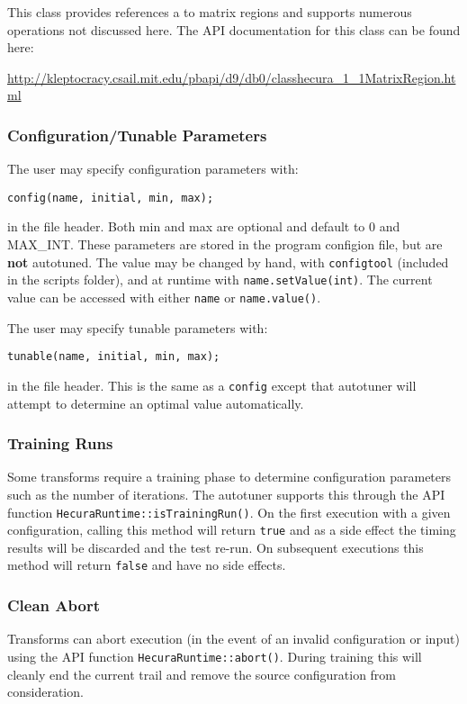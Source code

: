 \documentclass[11pt]{article}
\begin{document}
This class provides references a to matrix regions and supports numerous operations
not discussed here.  The API documentation for this class can be found here:

\noindent
\url{http://kleptocracy.csail.mit.edu/pbapi/d9/db0/classhecura_1_1MatrixRegion.html}

\subsubsection{Configuration/Tunable Parameters}

The user may specify configuration parameters with:
\begin{verbatim}
config(name, initial, min, max);
\end{verbatim}
in the file header.  Both min and max are optional and default to 0 and
MAX\_INT.  These parameters are stored in the program configion file, but are
{\bf not} autotuned.  The value may be changed by hand, with {\tt configtool}
(included in the scripts folder), and at runtime with {\tt name.setValue(int)}.
The current value can be accessed with either {\tt name} or {\tt name.value()}.

The user may specify tunable parameters with:
\begin{verbatim}
tunable(name, initial, min, max);
\end{verbatim}
in the file header.  This is the same as a {\tt config} except that autotuner 
will attempt to determine an optimal value automatically.

\subsubsection{Training Runs}

Some transforms require a training phase to determine configuration parameters
such as the number of iterations.  The autotuner supports this through the
API function {\tt HecuraRuntime::isTrainingRun()}.  On the first execution
with a given configuration, calling this method will return {\tt true} and
as a side effect the timing results will be discarded and the test re-run.
On subsequent executions this method will return {\tt false} and have no
side effects.

\subsubsection{Clean Abort}

Transforms can abort execution (in the event of an invalid configuration or
input) using the API function {\tt HecuraRuntime::abort()}.  During training
this will cleanly end the current trail and remove the source configuration
from consideration.
\end{document}
